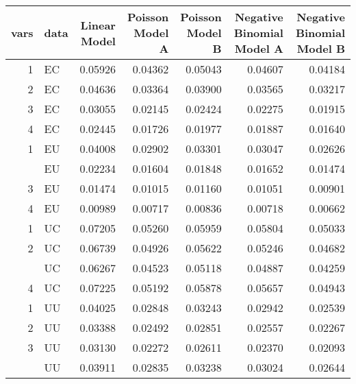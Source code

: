 
\begin{tabular}[t]{rlrrrrr}
\toprule
vars & data & Linear Model & Poisson Model A & Poisson Model B & Negative Binomial Model A & Negative Binomial Model B\\
\midrule
1 & EC & 0.05926 & 0.04362 & 0.05043 & 0.04607 & 0.04184\\
2 & EC & 0.04636 & 0.03364 & 0.03900 & 0.03565 & 0.03217\\
3 & EC & 0.03055 & 0.02145 & 0.02424 & 0.02275 & 0.01915\\
4 & EC & 0.02445 & 0.01726 & 0.01977 & 0.01887 & 0.01640\\
1 & EU & 0.04008 & 0.02902 & 0.03301 & 0.03047 & 0.02626\\
\addlinespace
2 & EU & 0.02234 & 0.01604 & 0.01848 & 0.01652 & 0.01474\\
3 & EU & 0.01474 & 0.01015 & 0.01160 & 0.01051 & 0.00901\\
4 & EU & 0.00989 & 0.00717 & 0.00836 & 0.00718 & 0.00662\\
1 & UC & 0.07205 & 0.05260 & 0.05959 & 0.05804 & 0.05033\\
2 & UC & 0.06739 & 0.04926 & 0.05622 & 0.05246 & 0.04682\\
\addlinespace
3 & UC & 0.06267 & 0.04523 & 0.05118 & 0.04887 & 0.04259\\
4 & UC & 0.07225 & 0.05192 & 0.05878 & 0.05657 & 0.04943\\
1 & UU & 0.04025 & 0.02848 & 0.03243 & 0.02942 & 0.02539\\
2 & UU & 0.03388 & 0.02492 & 0.02851 & 0.02557 & 0.02267\\
3 & UU & 0.03130 & 0.02272 & 0.02611 & 0.02370 & 0.02093\\
\addlinespace
4 & UU & 0.03911 & 0.02835 & 0.03238 & 0.03024 & 0.02644\\
\bottomrule
\end{tabular}
